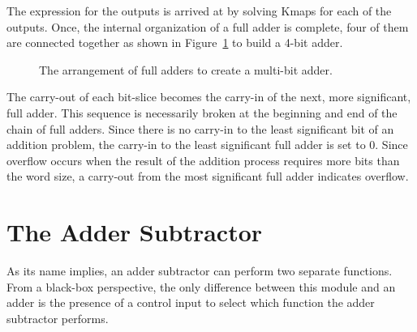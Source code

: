 The \SOPmin expression for the outputs is arrived at by
solving Kmaps for each of the outputs.  Once, the internal
organization of a full adder is complete, four of them
are connected together as shown in Figure~\ref{fig:adder}
to build a 4-bit adder.

\begin{figure}[ht]
\caption{The arrangement of full adders to create a multi-bit
adder.}
\label{fig:adder}
\end{figure}
\label{page:add}

The carry-out of each bit-slice becomes the carry-in of the
next, more significant, full adder.  This sequence is necessarily
broken at the beginning and end of the chain of full 
adders.  Since there is no carry-in to the least significant
bit of an addition problem, the carry-in to the least significant
full adder is set to 0.  Since overflow occurs when the result 
of the addition process requires more bits than the word size, a 
carry-out from the most significant full adder indicates overflow.

\section{The Adder Subtractor}
As its name implies, an adder subtractor can perform two separate
functions.  From a black-box perspective, the only difference between
this module and an adder is the presence of a control input to select
which function the adder subtractor performs.
 


